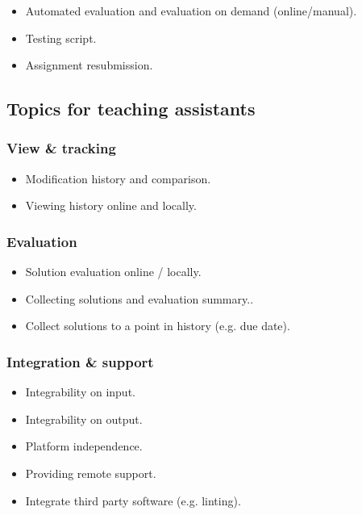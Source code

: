 \begin{itemize}
\item
  {Automated evaluation and e}{valuation on demand (online/manual).}
\item
  {Testing script.}
\item
  {Assignment resubmission.}
\end{itemize}

\subsection{Topics for teaching assistants} \label{ssec:ta}

\subsubsection{View \& tracking}

\begin{itemize}
\item
  {Modification history and comparison.}
\item
  {Viewing history online and locally.}
\end{itemize}

\subsubsection{Evaluation}

\begin{itemize}
\item
  {Solution evaluation online / locally}{.}
\item
  {Collecting solutions and evaluation summary..}
\item
  {Collect solutions to a point in history (e.g. due date).}
\end{itemize}

\subsubsection{Integration \& support}

\begin{itemize}
\item
  {Integrability on input.}
\item
  {Integrability on output.}
\item
  {Platform independence.}
\item
  {Providing remote support.}
\item
  {Integrate third party software (e.g. linting).}
\end{itemize}

